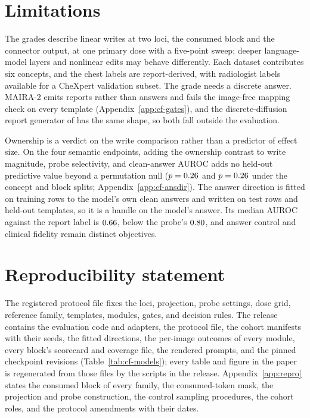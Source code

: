 \documentclass{article}
\begin{document}
\section{Limitations}
\label{sec:limitations}

The grades describe linear writes at two loci, the consumed block and the connector output, at one primary dose with a five-point sweep; deeper language-model layers and nonlinear edits may behave differently. Each dataset contributes six concepts, and the chest labels are report-derived, with radiologist labels available for a CheXpert validation subset. The grade needs a discrete answer. MAIRA-2 \citep{bannur2024maira} emits reports rather than answers and fails the image-free mapping check on every template (Appendix~\ref{app:cf-gates}), and the discrete-diffusion report generator of \citet{chen2026echo} has the same shape, so both fall outside the evaluation.

Ownership is a verdict on the write comparison rather than a predictor of effect size. On the four semantic endpoints, adding the ownership contrast to write magnitude, probe selectivity, and clean-answer AUROC adds no held-out predictive value beyond a permutation null ($p=0.26$ and $p=0.26$ under the concept and block splits; Appendix~\ref{app:cf-ansdir}). The answer direction is fitted on training rows to the model's own clean answers and written on test rows and held-out templates, so it is a handle on the model's answer. Its median AUROC against the report label is $0.66$, below the probe's $0.80$, and answer control and clinical fidelity remain distinct objectives.
\section*{Reproducibility statement}
The registered protocol file fixes the loci, projection, probe settings, dose grid, reference family, templates, modules, gates, and decision rules. The release contains the evaluation code and adapters, the protocol file, the cohort manifests with their seeds, the fitted directions, the per-image outcomes of every module, every block's scorecard and coverage file, the rendered prompts, and the pinned checkpoint revisions (Table~\ref{tab:cf-models}); every table and figure in the paper is regenerated from those files by the scripts in the release. Appendix~\ref{app:repro} states the consumed block of every family, the consumed-token mask, the projection and probe construction, the control sampling procedures, the cohort roles, and the protocol amendments with their dates.
\end{document}
